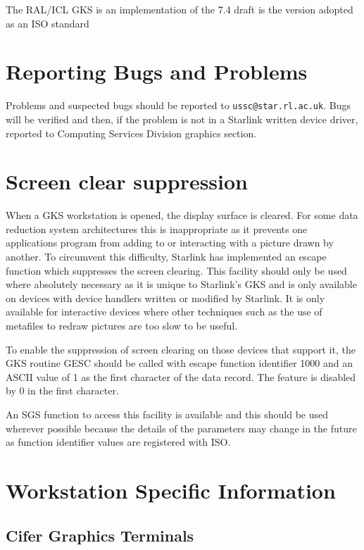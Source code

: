 \documentclass[11pt]{article}
\begin{document}
The RAL/ICL GKS is an implementation of the 7.4 draft 
is the version adopted as an ISO standard 

\section{Reporting Bugs and Problems}
Problems and suspected bugs should be reported to {\tt ussc@star.rl.ac.uk}.
Bugs will be verified and then, if the problem is not in a Starlink written
device driver, reported to Computing Services Division graphics section.

\section{Screen clear suppression}
When a GKS workstation is opened, the display surface is cleared.
For some data reduction system architectures this is inappropriate as it
prevents one applications program from adding to or interacting with a picture
drawn by another.
To circumvent this difficulty, Starlink has implemented an escape function which
suppresses the screen clearing.
This facility should only be used where absolutely necessary as it is unique to
Starlink's GKS and is only available on devices with device handlers written
or modified by Starlink.
It is only available for interactive devices where other techniques such as the
use of metafiles to redraw pictures are too slow to be useful.

To enable the suppression of screen clearing on those devices that support it,
the GKS routine GESC should be called with escape function identifier 1000 and
an ASCII value of 1 as the first character of the data record. The feature is
disabled by 0 in the first character.

An SGS function to access this facility is available and this should be used
wherever possible because the details of the parameters may change in the future
as function identifier values are registered with ISO.

\newpage\appendix
\section{Workstation Specific Information}\label{workstations}

\newcommand{\sect}[1]{{\bf #1}}

\subsection{Cifer Graphics Terminals}
\label{cifgt}
\end{document}
